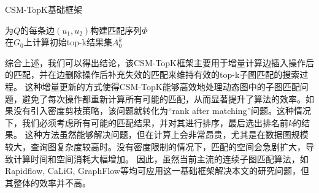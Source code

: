 \begin{algorithm}[h!]
\small
\caption{\label{alg:baseline:framework}CSM-TopK基础框架}
	为$Q$的每条边$(u_1, u_2)$构建匹配序列$\Phi$ \label{code:build-matching-order} \\
	在$G_0$上计算初始top-k结果集$A_0^k$ \label{code:build-initial-topk}\\
\Return
\end{algorithm}

综合上述，我们可以得出结论，该CSM-TopK框架主要用于增量计算边插入操作后的匹配，并在边删除操作后补充失效的匹配来维持有效的top-k子图匹配的搜索过程。
这种增量更新的方式使得CSM-TopK能够高效地处理动态图中的子图匹配问题，避免了每次操作都重新计算所有可能的匹配，从而显著提升了算法的效率。如果没有引入密度剪枝策略，该问题就转化为“rank after matching”问题。这种情况下，我们必须考虑所有可能的匹配结果，并对其进行排序，最后选出排名前$k$的结果。
这种方法虽然能够解决问题，但在计算上会非常昂贵，尤其是在数据图规模较大，查询图复杂度较高时。没有密度限制的情况下，匹配的空间会急剧扩大，导致计算时间和空间消耗大幅增加。
因此，虽然当前主流的连续子图匹配算法，如Rapidflow\cite{csm-rapidflow-DBLP:journals/pvldb/SunSHL22}, CaLiG\cite{csm-calig-DBLP:journals/pacmmod/YangZZY23}, GraphFlow\cite{csm-graphflow-DBLP:conf/sigmod/KankanamgeSMCS17}等均可应用这一基础框架解决本文的研究问题，但其整体的效率并不高。

